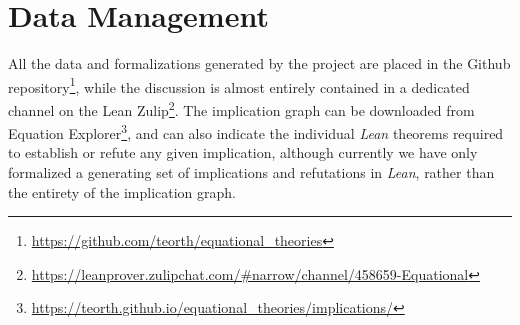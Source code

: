 \section{Data Management}


All the data and formalizations generated by the project are placed in the Github repository\footnote{\url{https://github.com/teorth/equational_theories}}, while the discussion is almost entirely contained in a dedicated channel on the Lean Zulip\footnote{\url{https://leanprover.zulipchat.com/\#narrow/channel/458659-Equational}}.  The implication graph can be downloaded from Equation Explorer\footnote{\url{https://teorth.github.io/equational_theories/implications/}}, and can also indicate the individual \emph{Lean} theorems required to establish or refute any given implication, although currently we have only formalized a generating set of implications and refutations in \emph{Lean}, rather than the entirety of the implication graph.
